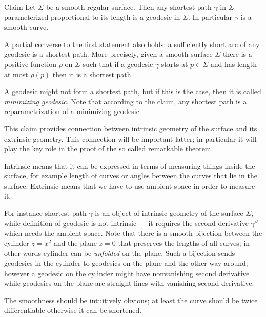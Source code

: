 \begin{thm}{Claim}\label{clm:gamma''}
Let $\Sigma$ be a smooth regular surface.
Then any shortest path $\gamma$ in $\Sigma$ parameterized proportional to its length is a geodesic in $\Sigma$.
In particular $\gamma$ is a smooth curve.

A partial converse to the first statement also holds: a sufficiently short arc of any geodesic is a shortest path.
More precisely, given a smooth surface $\Sigma$ there is a positive function $\rho$ on $\Sigma$ such that 
if a geodesic $\gamma$ starts at $p\in \Sigma$ and has length at most $\rho(p)$ then it is a shortest path.
\end{thm}

A geodesic might not form a shortest path, but if this is the case, then it is called \emph{minimizing geodesic}.
Note that according to the claim, any shortest path is a reparametrization of a minimizing geodesic.

This claim provides connection between intrinsic geometry of the surface and its extrinsic geometry.
This connection will be important latter; in particular it will play the key role in the proof of the so called remarkable theorem. %

Intrinsic means that it can be expressed in terms of measuring things inside the surface, for example length of curves or angles between the curves that lie in the surface.
Extrinsic means that we have to use ambient space in order to measure it.

For instance shortest path $\gamma$ is an object of intrinsic geometry of the surface $\Sigma$,
while definition of geodesic is not intrinsic --- it requires the second derivative $\gamma''$ which needs the ambient space.
Note that there is a smooth bijection between the cylinder $z=x^2$ and the plane $z=0$ that preserves the lengths of all curves; in other words cylinder can be \emph{unfolded} on the plane.
Such a bijection sends geodesics in the cylinder to geodesics on the plane and the other way around; however a geodesic on the cylinder might have nonvanishing second derivative while geodesics on the plane are straight lines with vanishing second derivative.



The smoothness should be intuitively obvious; at least the curve should be twice differentiable otherwise it can be shortened.

